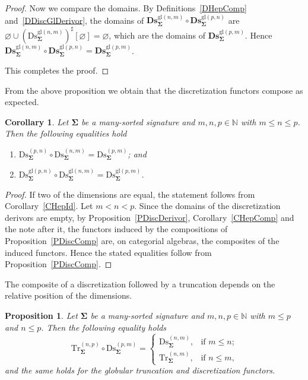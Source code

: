 \documentclass[a4paper, reqno
]{amsart}
\newcommand{\sig}[1]{\mathbf{#1}}             %
\newcommand{\gl}{\mathrm{gl}}                %
\newcommand{\Ds}{\mathrm{Ds}}
\newcommand{\Tr}{\mathrm{Tr}}
\newcommand{\bDs}{\mathbf{Ds}}
\theoremstyle{plain}
\newtheorem{proposition}[theorem]{Proposition}
\newtheorem{corollary}[theorem]{Corollary}
\theoremstyle{definition}
\begin{document}
\begin{proof}
Now we compare the domains.
By Definitions~\ref{DHepComp} and~\ref{DDiscGlDerivor}, the domains of $\bDs^{\gl(n,m)}_{\sig{\Sigma}}\circ\bDs^{\gl(p,n)}_{\sig{\Sigma}}$ are $\varnothing\cup(\Ds^{\gl(n,m)}_{\sig{\Sigma}})^{\sharp}[\varnothing]=\varnothing$, which are the domains of $\bDs^{\gl(p,m)}_{\sig{\Sigma}}$.
Hence $\bDs^{\gl(n,m)}_{\sig{\Sigma}}\circ\bDs^{\gl(p,n)}_{\sig{\Sigma}}=\bDs^{\gl(p,m)}_{\sig{\Sigma}}$.

This completes the proof.
\end{proof}

From the above proposition we obtain that the discretization functors compose as expected.

\begin{corollary}\label{CDiscComp}
Let $\sig{\Sigma}$ be a many-sorted signature and $m,n,p\in\mathbb{N}$ with $m\leq n\leq p$.
Then the following equalities hold
\begin{enumerate}
	\item
	$\Ds^{(p,n)}_{\sig{\Sigma}}\circ\Ds^{(n,m)}_{\sig{\Sigma}}=\Ds^{(p,m)}_{\sig{\Sigma}}$; and

	\item
	$\Ds^{\gl(p,n)}_{\sig{\Sigma}}\circ\Ds^{\gl(n,m)}_{\sig{\Sigma}}=\Ds^{\gl(p,m)}_{\sig{\Sigma}}$.
\end{enumerate}
\end{corollary}
\begin{proof}
If two of the dimensions are equal, the statement follows from Corollary~\ref{CHepId}.
Let $m<n<p$.
Since the domains of the discretization derivors are empty, by Proposition~\ref{PDiscDerivor}, Corollary~\ref{CHepComp} and the note after it, the functors induced by the compositions of Proposition~\ref{PDiscComp} are, on categorial algebras, the composites of the induced functors.
Hence the stated equalities follow from Proposition~\ref{PDiscComp}.
\end{proof}

The composite of a discretization followed by a truncation depends on the relative position of the dimensions.

\begin{proposition}\label{PTruncDiscComp}
Let $\sig{\Sigma}$ be a many-sorted signature and $m,n,p\in\mathbb{N}$ with $m\leq p$ and $n\leq p$.
Then the following equality holds
$$
\Tr^{(n,p)}_{\sig{\Sigma}}\circ\Ds^{(p,m)}_{\sig{\Sigma}}=
\begin{cases}
\Ds^{(n,m)}_{\sig{\Sigma}}, & \text{if $m\leq n$;}\\
\Tr^{(n,m)}_{\sig{\Sigma}}, & \text{if $n\leq m$,}
\end{cases}
$$
and the same holds for the globular truncation and discretization functors.
\end{proposition}
\end{document}
